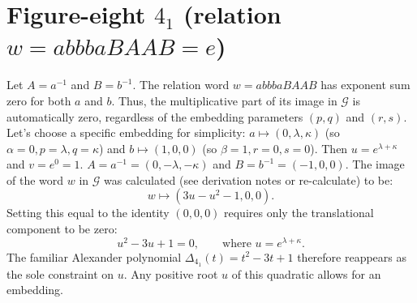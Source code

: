 \documentclass{article}
\begin{document}
\section{Figure-eight $4_1$ (relation $w = abbbaBAAB = e$)}
Let $A=a^{-1}$ and $B=b^{-1}$. The relation word $w = abbbaBAAB$ has exponent sum zero for both $a$ and $b$. Thus, the multiplicative part of its image in $\mathcal{G}$ is automatically zero, regardless of the embedding parameters $(p,q)$ and $(r,s)$.
Let's choose a specific embedding for simplicity: $a \mapsto (0,\lambda,\kappa)$ (so $\alpha=0, p=\lambda, q=\kappa$) and $b \mapsto (1,0,0)$ (so $\beta=1, r=0, s=0$). Then $u=e^{\lambda+\kappa}$ and $v=e^{0}=1$. $A=a^{-1}=(0,-\lambda,-\kappa)$ and $B=b^{-1}=(-1,0,0)$.
The image of the word $w$ in $\mathcal{G}$ was calculated (see derivation notes or re-calculate) to be:
\begin{equation}
w \longmapsto (3u-u^2-1, 0, 0).
\end{equation}
Setting this equal to the identity $(0,0,0)$ requires only the translational component to be zero:
\begin{equation}
u^2-3u+1=0, \qquad \text{where } u=e^{\lambda+\kappa}.
\end{equation}
The familiar Alexander polynomial $\Delta_{4_1}(t)=t^{2}-3t+1$ therefore reappears as the sole constraint on $u$. Any positive root $u$ of this quadratic allows for an embedding.
\end{document}
